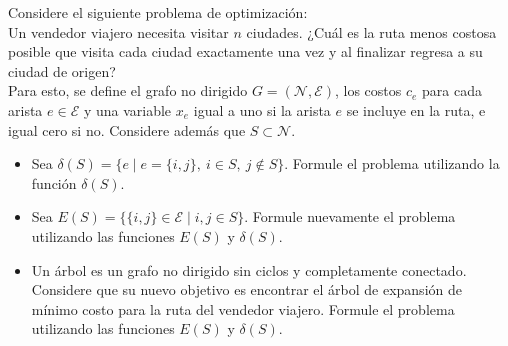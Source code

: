Considere el siguiente problema de optimización: \\

Un vendedor viajero necesita visitar $n$ ciudades. ¿Cuál es la ruta menos costosa posible que visita cada ciudad exactamente una vez y al finalizar regresa a su ciudad de origen? \\

Para esto, se define el grafo no dirigido $G = (\mathcal{N}, \mathcal{E})$, los costos $c_e$ para cada arista $e \in \mathcal{E}$ y una variable $x_e$ igual a uno si la arista $e$ se incluye en la ruta, e igual cero si no. Considere además que $S \subset \mathcal{N}$.\\

\begin{itemize}
    \item[(a)] Sea $\delta(S) = \{ e \mid e = \{i,j\},\ i \in S,\ j \notin S \}$. Formule el problema utilizando la función $\delta(S)$.

    \item[(b)] Sea $E(S) = \{ \{i,j\} \in \mathcal{E} \mid i,j \in S \}$. Formule nuevamente el problema utilizando las funciones $E(S)$ y $\delta(S)$.
    \item[(c)] Un árbol es un grafo no dirigido sin ciclos y completamente conectado. Considere que su nuevo objetivo es encontrar el árbol de expansión de mínimo costo para la ruta del vendedor viajero. Formule el problema utilizando las funciones $E(S)$ y $\delta(S)$.
\end{itemize}
